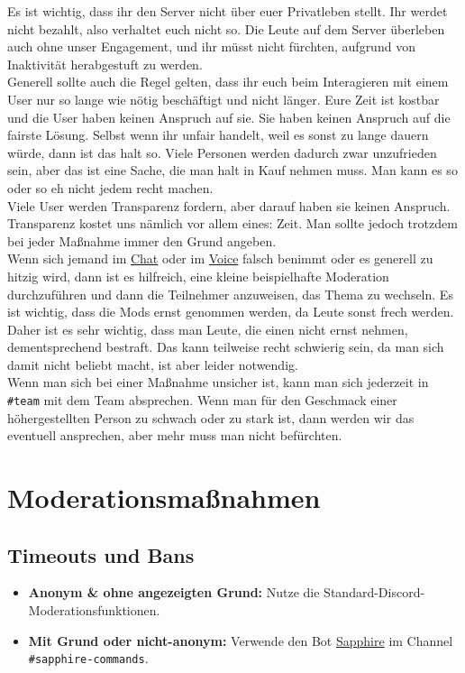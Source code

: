 \documentclass[a4paper,12pt]{article}
\begin{document}
Es ist wichtig, dass ihr den Server nicht über euer Privatleben stellt. Ihr werdet nicht bezahlt, also verhaltet euch nicht so.
Die Leute auf dem Server überleben auch ohne unser Engagement, und ihr müsst nicht fürchten, aufgrund von Inaktivität herabgestuft zu werden.\\
Generell sollte auch die Regel gelten, dass ihr euch beim Interagieren mit einem User nur so lange wie nötig beschäftigt und nicht länger.
Eure Zeit ist kostbar und die User haben keinen Anspruch auf sie. Sie haben keinen Anspruch auf die fairste Lösung. Selbst wenn ihr unfair handelt, weil
es sonst zu lange dauern würde, dann ist das halt so. Viele Personen werden dadurch zwar unzufrieden sein, aber das ist eine Sache, die man halt in Kauf nehmen muss.
Man kann es so oder so eh nicht jedem recht machen.\\
Viele User werden Transparenz fordern, aber darauf haben sie keinen Anspruch. Transparenz kostet uns nämlich vor allem eines: Zeit. Man sollte jedoch trotzdem bei jeder Maßnahme immer den Grund angeben.\\
Wenn sich jemand im \hyperlink{term:chat}{Chat} oder im \hyperlink{term:vc}{Voice} falsch benimmt oder es generell zu hitzig wird, dann ist es hilfreich, eine kleine beispielhafte Moderation durchzuführen und dann die Teilnehmer anzuweisen, das Thema zu wechseln. 
Es ist wichtig, dass die Mods ernst genommen werden, da Leute sonst frech werden. Daher ist es sehr wichtig, dass man Leute, die einen nicht ernst nehmen, dementsprechend bestraft.
Das kann teilweise recht schwierig sein, da man sich damit nicht beliebt macht, ist aber leider notwendig.\\
Wenn man sich bei einer Maßnahme unsicher ist, kann man sich jederzeit in \texttt{\#team} mit dem Team absprechen. Wenn man für den Geschmack einer höhergestellten Person zu schwach oder zu stark ist, dann werden wir das eventuell ansprechen, aber mehr muss man nicht befürchten.

\section{Moderationsmaßnahmen}
\label{sec:sapphire}
\hypertarget{sec:sapphire}{}
\subsection{Timeouts und Bans}
\begin{itemize}
    \item \textbf{Anonym \& ohne angezeigten Grund:} Nutze die Standard-Discord-Moderationsfunktionen.
    \item \textbf{Mit Grund oder nicht-anonym:} Verwende den Bot \hyperlink{term:sapphire}{Sapphire} im Channel \texttt{\#sapphire-commands}.
\end{itemize}
\end{document}
